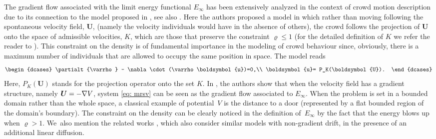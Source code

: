 The gradient flow associated with the limit energy functional $E_\infty$ has been extensively analyzed in the context of crowd motion description due to its connection to the model proposed in \cite{MRSV2011}, see also \cite{MRS2010}. Here the authors proposed a model in which rather than moving following the spontaneous velocity field, $\boldsymbol{U}$, (namely the velocity individuals would have in the absence of others), the crowd follows the projection of $\boldsymbol{U}$ onto the space of admissible velocities, $K$, which are those that preserve the constraint $\varrho\leq 1$ (for the detailed definition of $K$ we refer the reader to \cite{MRS2010, MRSV2011}). This constraint on the density is of fundamental importance in the modeling of crowd behaviour since, obviously, there is a maximum number of individuals that are allowed to occupy the same position in space. The model reads
\begin{equation}\label{eq: mrsv}
\begin{dcases}
\partialt{\varrho} - \nabla \cdot (\varrho \boldsymbol{u})=0,\\
\boldsymbol{u}= P_K(\boldsymbol{U}).
\end{dcases}
\end{equation}
Here, $P_K(\boldsymbol{U})$ stands for the projection operator onto the set $K$. In \cite{MRS2010}, the authors show that when the velocity field has a gradient structure, namely $\boldsymbol{U}=\nobreak-\nabla V$, system \eqref{eq: mrsv} can be seen as the gradient flow associated to $E_\infty$. When the problem is set in a bounded domain rather than the whole space, a classical example of potential~$V$ is the distance to a door (represented by a flat bounded region of the domain's boundary). The constraint on the density can be clearly noticed in the definition of~$E_\infty$ by the fact that the energy blows up when $\varrho>1$. We~also mention the related works \cite{MS2016,DM2016}, which also consider similar models with non-gradient drift, in the presence of an additional linear diffusion.

